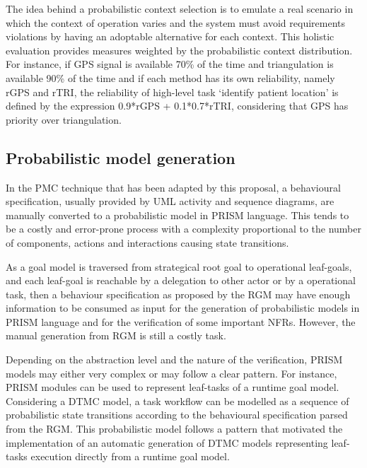 The idea behind a probabilistic context selection is to emulate a real scenario in which the context of operation varies and the system must avoid requirements violations by  having an adoptable alternative for each context. This holistic evaluation provides measures weighted by the probabilistic context distribution. For instance, if GPS signal is available 70\% of the time and triangulation is available 90\% of the time and if each method has its own reliability, namely rGPS and rTRI, the reliability of high-level task `identify patient location' is defined by the expression 0.9*rGPS + 0.1*0.7*rTRI, considering that GPS has priority over triangulation. 





\subsection{Probabilistic model generation}

In the PMC technique that has been adapted by this proposal, a behavioural specification, usually provided by UML activity and sequence diagrams, are manually converted to a probabilistic model in PRISM language. This tends to be a costly and error-prone process with a complexity proportional to the number of components, actions and interactions causing state transitions.  

As a goal model is traversed from strategical root goal to operational leaf-goals, and each leaf-goal is reachable by a delegation to other actor or by a operational task, then a behaviour specification as proposed by the RGM may have enough information to be consumed as input for the generation of probabilistic models in PRISM language and for the verification of some important NFRs. However, the manual generation from RGM is still a costly task.

Depending on the abstraction level and the nature of the verification, PRISM models may either very complex or may follow a clear pattern. For instance, PRISM modules can be used to represent leaf-tasks of a runtime goal model. Considering a DTMC model, a task workflow can be modelled as a sequence of probabilistic state transitions according to the behavioural specification parsed from the RGM. This probabilistic model follows a pattern that motivated the implementation of an automatic generation of DTMC models representing leaf-tasks execution directly from a runtime goal model.

